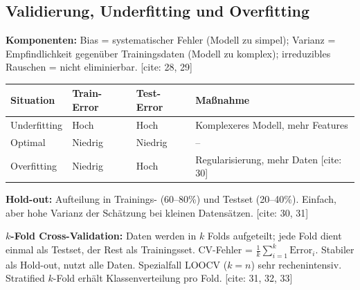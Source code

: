 \newpage

\subsection{Validierung, Underfitting und Overfitting}

\textbf{Komponenten:} Bias = systematischer Fehler (Modell zu simpel); Varianz = Empfindlichkeit gegenüber Trainingsdaten (Modell zu komplex); irreduzibles Rauschen = nicht eliminierbar. [cite: 28, 29]

\begin{table}[h]
    \centering\small
    \begin{tabular}{llll}
        \toprule
        \textbf{Situation} & \textbf{Train-Error} & \textbf{Test-Error} & \textbf{Maßnahme} \\
        \midrule
        Underfitting & Hoch & Hoch & Komplexeres Modell, mehr Features \\
        Optimal & Niedrig & Niedrig & -- \\
        Overfitting & Niedrig & Hoch & Regularisierung, mehr Daten [cite: 30] \\
        \bottomrule
    \end{tabular}
\end{table}


\textbf{Hold-out:} Aufteilung in Trainings- (60--80\%) und Testset (20--40\%). Einfach, aber hohe Varianz der Schätzung bei kleinen Datensätzen. [cite: 30, 31]

\textbf{$k$-Fold Cross-Validation:} Daten werden in $k$ Folds aufgeteilt; jede Fold dient einmal als Testset, der Rest als Trainingsset. CV-Fehler = $\frac{1}{k}\sum_{i=1}^k \text{Error}_i$. Stabiler als Hold-out, nutzt alle Daten. Spezialfall LOOCV ($k=n$) sehr rechenintensiv. Stratified $k$-Fold erhält Klassenverteilung pro Fold. [cite: 31, 32, 33]


